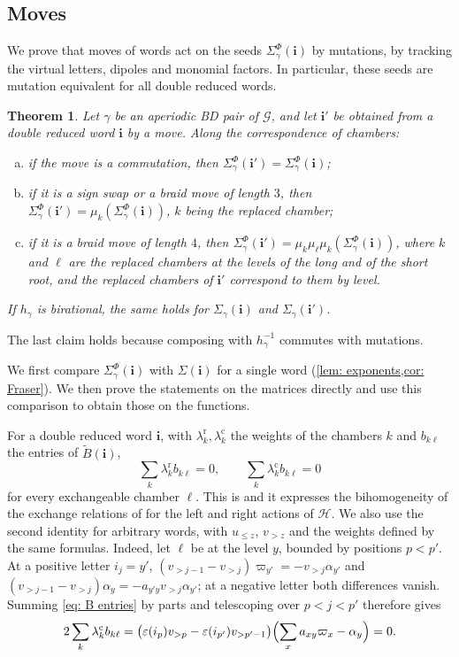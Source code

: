 \documentclass[a4paper]{amsart}
\numberwithin{equation}{section}
\newtheorem{theorem}{Theorem}[section]
\theoremstyle{definition}
\theoremstyle{remark}
\newcommand{\mcG}{\mathcal{G}}
\newcommand{\mcH}{\mathcal{H}}
\newcommand{\bfi}{\mathbf{i}}
\newcommand{\tB}{\widetilde{B}}
\newcommand{\rr}{\mathrm{r}}
\newcommand{\cc}{\mathrm{c}}
\begin{document}
\subsection{Moves}
\label{sec: moves}
We prove that moves of words act on the seeds $\Sigma^\Phi_\gamma(\bfi)$ by mutations, by tracking the virtual letters, dipoles and monomial factors.
In particular, these seeds are mutation equivalent for all double reduced words.

\begin{theorem}
  \label{thm: moves}
  Let $\gamma$ be an aperiodic BD pair of $\mcG$, and let $\bfi'$ be obtained from a double reduced word $\bfi$ by a move.
  Along the correspondence of chambers:
  \begin{enumerate}[(a)]
    \item if the move is a commutation, then $\Sigma^\Phi_\gamma(\bfi')=\Sigma^\Phi_\gamma(\bfi)$;
    \item if it is a sign swap or a braid move of length $3$, then $\Sigma^\Phi_\gamma(\bfi')=\mu_k(\Sigma^\Phi_\gamma(\bfi))$, $k$ being the replaced chamber;
    \item if it is a braid move of length $4$, then $\Sigma^\Phi_\gamma(\bfi')=\mu_k\mu_\ell\mu_k(\Sigma^\Phi_\gamma(\bfi))$, where $k$ and $\ell$ are the replaced chambers at the levels of the long and of the short root, and the replaced chambers of $\bfi'$ correspond to them by level.
  \end{enumerate}
  If $h_\gamma$ is birational, the same holds for $\Sigma_\gamma(\bfi)$ and $\Sigma_\gamma(\bfi')$.
\end{theorem}
The last claim holds because composing with $h_\gamma^{-1}$ commutes with mutations.

We first compare $\Sigma^\Phi_\gamma(\bfi)$ with $\Sigma(\bfi)$ for a single word (\cref{lem: exponents,cor: Fraser}).
We then prove the statements on the matrices directly and use this comparison to obtain those on the functions.

For a double reduced word $\bfi$, with $\lambda^\rr_k,\lambda^\cc_k$ the weights of the chambers $k$ and $b_{k\ell}$ the entries of $\tB(\bfi)$,
\begin{equation}
  \label{eq: homogeneity}
  \sum_k\lambda^\rr_k b_{k\ell}=0,
  \qquad
  \sum_k\lambda^\cc_k b_{k\ell}=0
\end{equation}
for every exchangeable chamber $\ell$.
This is \cite[Lemma~4.22]{GSV10} and it expresses the bihomogeneity of the exchange relations of \cite{BFZ05} for the left and right actions of $\mcH$.
We also use the second identity for arbitrary words, with $u_{\le z}$, $v_{>z}$ and the weights defined by the same formulas.
Indeed, let $\ell$ be at the level $y$, bounded by positions $p<p'$.
At a positive letter $i_j=y'$, $(v_{>j-1}-v_{>j})\varpi_{y'}=-v_{>j}\alpha_{y'}$ and~$(v_{>j-1}-v_{>j})\alpha_y=-a_{y'y}v_{>j}\alpha_{y'}$; at a negative letter both differences vanish.
Summing \eqref{eq: B entries} by parts and telescoping over $p<j<p'$ therefore gives
\[
  2\sum_k\lambda^\cc_k b_{k\ell}
  =\bigl(\varepsilon(i_p)v_{>p}-\varepsilon(i_{p'})v_{>p'-1}\bigr)
  \Bigl(\sum_x a_{xy}\varpi_x-\alpha_y\Bigr)=0.
\]
\end{document}
